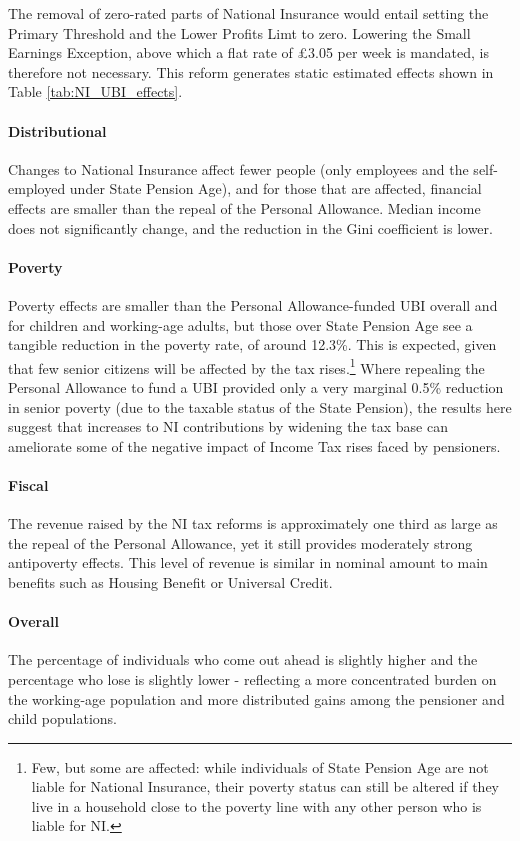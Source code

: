 \documentclass{article}
\begin{document}
    The removal of zero-rated parts of National Insurance would entail setting the Primary Threshold and the Lower Profits Limt to zero. Lowering the Small Earnings Exception, above which a flat rate of £3.05 per week is mandated, is therefore not necessary. This reform generates static estimated effects shown in Table \ref{tab:NI_UBI_effects}.

    \paragraph{Distributional} Changes to National Insurance affect fewer people (only employees and the self-employed under State Pension Age), and for those that are affected, financial effects are smaller than the repeal of the Personal Allowance. Median income does not significantly change, and the reduction in the Gini coefficient is lower. 
    \paragraph{Poverty} Poverty effects are smaller than the Personal Allowance-funded UBI overall and for children and working-age adults, but those over State Pension Age see a tangible reduction in the poverty rate, of around 12.3\%. This is expected, given that few senior citizens will be affected by the tax rises.\footnote{Few, but some are affected: while individuals of State Pension Age are not liable for National Insurance, their poverty status can still be altered if they live in a household close to the poverty line with any other person who is liable for NI.} Where repealing the Personal Allowance to fund a UBI provided only a very marginal 0.5\% reduction in senior poverty (due to the taxable status of the State Pension), the results here suggest that increases to NI contributions by widening the tax base can ameliorate some of the negative impact of Income Tax rises faced by pensioners.
    \paragraph{Fiscal} The revenue raised by the NI tax reforms is approximately one third as large as the repeal of the Personal Allowance, yet it still provides moderately strong antipoverty effects. This level of revenue is similar in nominal amount to main benefits such as Housing Benefit or Universal Credit.
    \paragraph{Overall} The percentage of individuals who come out ahead is slightly higher and the percentage who lose is slightly lower - reflecting a more concentrated burden on the working-age population and more distributed gains among the pensioner and child populations.
\end{document}
